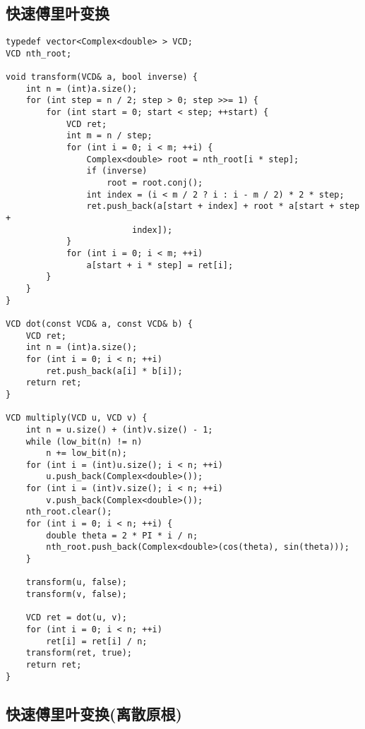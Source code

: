 \documentclass{article}
\begin{document}
\subsection{快速傅里叶变换}

\begin{lstlisting}
typedef vector<Complex<double> > VCD;
VCD nth_root;

void transform(VCD& a, bool inverse) {
    int n = (int)a.size();
    for (int step = n / 2; step > 0; step >>= 1) {
        for (int start = 0; start < step; ++start) {
            VCD ret;
            int m = n / step;
            for (int i = 0; i < m; ++i) {
                Complex<double> root = nth_root[i * step];
                if (inverse)
                    root = root.conj();
                int index = (i < m / 2 ? i : i - m / 2) * 2 * step;
                ret.push_back(a[start + index] + root * a[start + step +
                         index]);
            }
            for (int i = 0; i < m; ++i)
                a[start + i * step] = ret[i];
        }
    }
}

VCD dot(const VCD& a, const VCD& b) {
    VCD ret;
    int n = (int)a.size();
    for (int i = 0; i < n; ++i)
        ret.push_back(a[i] * b[i]);
    return ret;
}

VCD multiply(VCD u, VCD v) {
    int n = u.size() + (int)v.size() - 1;
    while (low_bit(n) != n)
        n += low_bit(n);
    for (int i = (int)u.size(); i < n; ++i)
        u.push_back(Complex<double>());
    for (int i = (int)v.size(); i < n; ++i)
        v.push_back(Complex<double>());
    nth_root.clear();
    for (int i = 0; i < n; ++i) {
        double theta = 2 * PI * i / n;
        nth_root.push_back(Complex<double>(cos(theta), sin(theta)));
    }

    transform(u, false);
    transform(v, false);

    VCD ret = dot(u, v);
    for (int i = 0; i < n; ++i)
        ret[i] = ret[i] / n;
    transform(ret, true);
    return ret;
}
\end{lstlisting}

\subsection{快速傅里叶变换(离散原根)}
\end{document}
